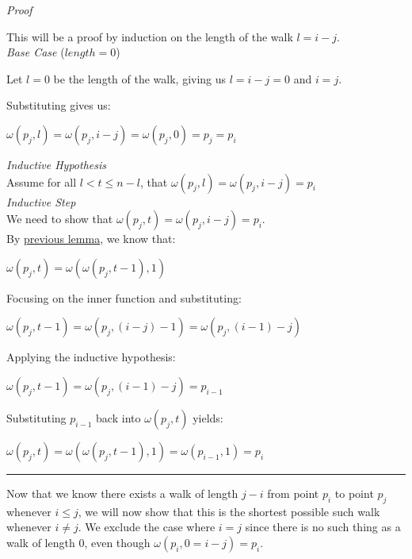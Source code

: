 \documentclass[a4paper,12pt]{article}
\begin{document}
\noindent
\textit{Proof}

\noindent This will be a proof by induction on the length of the walk $l = i - j$.\\

\noindent
\textit{Base Case} ($length = 0$)

\noindent Let $l = 0$ be the length of the walk, giving us $l = i - j = 0$ and $i = j$.

\noindent Substituting gives us:
\begin{center}
$\omega(p_j, l) = \omega(p_j, i - j) = \omega(p_j, 0) = p_j = p_i$
\end{center} 

\noindent
\textit{Inductive Hypothesis}\\
Assume for all $l < t \leq n - l$, that $\omega(p_j, l) = \omega(p_j, i - j) = p_i$\\

\noindent
\textit{Inductive Step}\\
We need to show that $\omega(p_j, t) = \omega(p_j, i - j) = p_i$.\\

\noindent By \hyperref[lemma:composition_of_sub_walks]{previous lemma}, we know that:
\begin{center}
$\omega(p_j, t) = \omega(\omega(p_j, t - 1), 1)$
\end{center}

\noindent Focusing on the inner function and substituting:
\begin{center}
$\omega(p_j, t - 1) = \omega(p_j, (i - j) - 1) = \omega(p_j, (i - 1) - j)$
\end{center}

\noindent Applying the inductive hypothesis:
\begin{center}
$\omega(p_j, t - 1) = \omega(p_j, (i - 1) - j) = p_{i-1}$
\end{center}

\noindent Substituting $p_{i-1}$ back into $\omega(p_j, t)$ yields:
\begin{center}
$\omega(p_j, t) = \omega(\omega(p_j, t - 1), 1) = \omega(p_{i-1}, 1) = p_i$
\end{center}

\begin{center}
\noindent\rule{8cm}{0.4pt}
\end{center}


\noindent Now that we know there exists a walk of length $j - i$ from point $p_i$ to point $p_j$ whenever $i \leq j$, we will now show that this is the shortest possible such walk whenever $i \neq j$. We exclude the case where $i = j$ since there is no such thing as a walk of length $0$, even though $\omega(p_i, 0 = i - j) = p_i$.\\
\end{document}
